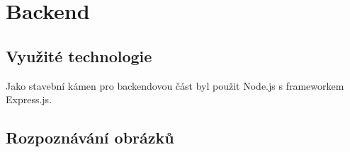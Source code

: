 \section{Backend}

\subsection{Využité technologie}
Jako stavební kámen pro backendovou část byl použit Node.js s frameworkem Express.js.

\subsection{Rozpoznávání obrázků}